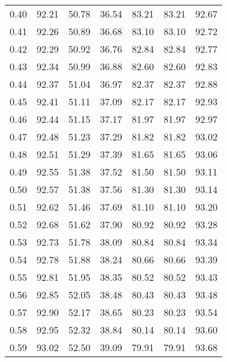 \begin{tabular}{|c|c|c|c|c|c|c|}
      0.40 &     92.21 &     50.78 &      36.54 &   83.21 &      83.21 &         92.67 \\
      0.41 &     92.26 &     50.89 &      36.68 &   83.10 &      83.10 &         92.72 \\
      0.42 &     92.29 &     50.92 &      36.76 &   82.84 &      82.84 &         92.77 \\
      0.43 &     92.34 &     50.99 &      36.88 &   82.60 &      82.60 &         92.83 \\
      0.44 &     92.37 &     51.04 &      36.97 &   82.37 &      82.37 &         92.88 \\
      0.45 &     92.41 &     51.11 &      37.09 &   82.17 &      82.17 &         92.93 \\
      0.46 &     92.44 &     51.15 &      37.17 &   81.97 &      81.97 &         92.97 \\
      0.47 &     92.48 &     51.23 &      37.29 &   81.82 &      81.82 &         93.02 \\
      0.48 &     92.51 &     51.29 &      37.39 &   81.65 &      81.65 &         93.06 \\
      0.49 &     92.55 &     51.38 &      37.52 &   81.50 &      81.50 &         93.11 \\
      0.50 &     92.57 &     51.38 &      37.56 &   81.30 &      81.30 &         93.14 \\
      0.51 &     92.62 &     51.46 &      37.69 &   81.10 &      81.10 &         93.20 \\
      0.52 &     92.68 &     51.62 &      37.90 &   80.92 &      80.92 &         93.28 \\
      0.53 &     92.73 &     51.78 &      38.09 &   80.84 &      80.84 &         93.34 \\
      0.54 &     92.78 &     51.88 &      38.24 &   80.66 &      80.66 &         93.39 \\
      0.55 &     92.81 &     51.95 &      38.35 &   80.52 &      80.52 &         93.43 \\
      0.56 &     92.85 &     52.05 &      38.48 &   80.43 &      80.43 &         93.48 \\
      0.57 &     92.90 &     52.17 &      38.65 &   80.23 &      80.23 &         93.54 \\
      0.58 &     92.95 &     52.32 &      38.84 &   80.14 &      80.14 &         93.60 \\
      0.59 &     93.02 &     52.50 &      39.09 &   79.91 &      79.91 &         93.68 \\

\end{tabular}
